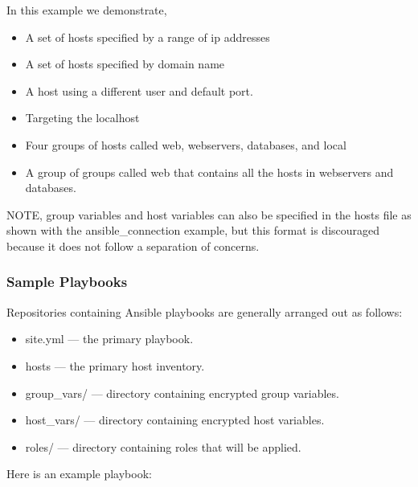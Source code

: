 

In this example we demonstrate, 
\begin{itemize}
	\item A set of hosts specified by a range of ip addresses
	\item A set of hosts specified by domain name
	\item A host using a different user and default port.
	\item Targeting the localhost
	\item Four groups of hosts called web, webservers, databases, and local
	\item A group of groups called web that contains all the hosts in webservers and databases.
\end{itemize}
NOTE, group variables and host variables can also be specified in the hosts file as shown with the ansible\_connection example, but this format is discouraged because it does not follow a separation of concerns.

\subsubsection{Sample Playbooks}

Repositories containing Ansible playbooks  are generally arranged out as follows:

\begin{itemize}
\item site.yml --- the primary playbook.
\item hosts --- the primary host inventory.
\item group\_vars/ --- directory containing encrypted group variables.
\item host\_vars/ --- directory containing encrypted host variables.
\item roles/ --- directory containing roles that will be applied.
\end{itemize}

Here is an example playbook:

